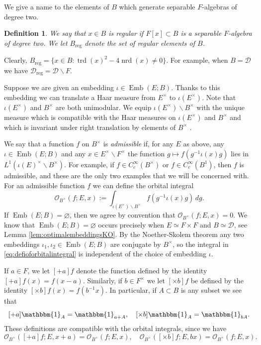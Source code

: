 \documentclass{article}
\newtheorem{defi}[lem]{Definition}
\theoremstyle{named}
\newcommand{\D}{\mathcal{D}}
\renewcommand{\O}{\mathcal{O}}
\DeclareMathOperator{\reg}{reg}
\DeclareMathOperator{\Emb}{Emb}
\DeclareMathOperator{\nrd}{nrd}
\DeclareMathOperator{\trd}{trd}
\begin{document}
We give a name to the elements of $B$ which generate separable $F$-algebras of degree two.
\begin{defi}\label{defi:regularelements}
We say that $x \in B$ is \emph{regular} if $F[x]\subset B$ is a separable $F$-algebra of degree two. We let $B_{\reg}$ denote the set of regular elements of $B$.
\end{defi}
Clearly, $B_{\reg} = \{x \in B: \trd(x)^2 - 4\nrd(x) \neq 0\}$. For example, when $B = \D$ we have $\D_{\reg} = \D \smallsetminus F$. 

Suppose we are given an embedding $\iota \in \Emb(E; B)$. Thanks to this embedding we can translate a Haar measure from $E^\times$ to $\iota(E^\times)$. Note that $\iota(E^\times)$ and $B^\times$ are both unimodular. We equip $\iota(E^\times)\backslash B^\times$ with the unique measure which is compatible with the Haar measures on $\iota(E^\times)$ and $B^\times$ and which is invariant under right translation by elements of $B^\times$ \cite[Ch. VII, §2, No. 6, Cor. 2]{bourbakiintegrationii}.

We say that a function $f$ on $B^\times$ is \emph{admissible} if, for any $E$ as above, any $\iota \in \Emb(E; B)$ and any $x \in E^\times \smallsetminus F^\times$ the function $g \mapsto f(g^{-1}\iota(x)g)$ lies in $L^1(\iota(E)^\times\backslash B^\times)$. For example, if $f \in C_c^\infty(B^\times)$ or $f \in C_c^\infty(B^1)$, then $f$ is admissible, and these are the only two examples that we will be concerned with. For an admissible function $f$ we can define the orbital integral
\begin{equation}\label{eq:defioforbitalintegral}
    \O_{B^\times}(f; E, x) := \int_{\iota(E^\times)\backslash B^\times}f(g^{-1}\iota(x)g)\, dg.
\end{equation} 
If $\Emb(E; B) = \varnothing$, then we agree by convention that $\O_{B^\times}(f; E, x) = 0$. We know that $\Emb(E; B) = \varnothing$ occurs precisely when $E \simeq F \times F$ and $B \simeq \D$, see Lemma \ref{lem:optimalembeddingsKO}. By the Noether-Skolem theorem \cite[Theorem 7.7.1]{voight} any two embeddings $\iota_1, \iota_2 \in \Emb(E; B)$ are conjugate by $B^\times$, so the integral in \eqref{eq:defioforbitalintegral} is independent of the choice of embedding $\iota$. 

If $a \in F$, we let $[+a]f$ denote the function defined by the identity $[+a]f(x) = f(x- a)$. Similarly, if $b \in F^\times$ we let $[\times b]f$ be defined by the identity $[\times b]f(x) = f(b^{-1}x)$. In particular, if $A \subset B$ is any subset we see that
\begin{equation}\label{eq:translationdilationsets}
    [+a]\mathbbm{1}_{A} = \mathbbm{1}_{a + A},\quad [\times b]\mathbbm{1}_{A} = \mathbbm{1}_{bA}.
\end{equation}
These definitions are compatible with the orbital integrals, since we have
\begin{equation}\label{eq:transformationorbital}
    \O_{B^\times}([+a]f; E, x + a) = \O_{B^\times}(f; E, x), \quad \O_{B^\times}([\times b]f; E, bx) = \O_{B^\times}(f; E, x).
\end{equation}
\end{document}

